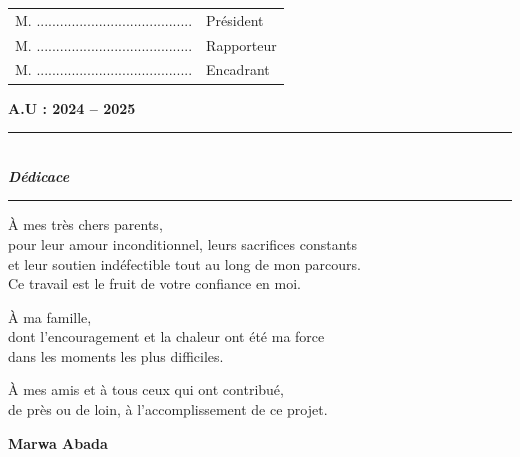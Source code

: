 \begin{titlepage}
\begin{center}
\begin{tabular}{p{7.5cm}p{3.5cm}}
M. ........................................ & Président \\
M. ........................................ & Rapporteur \\
M. ........................................ & Encadrant \\
\end{tabular}

\vfill

{\large \textbf{A.U : 2024 -- 2025}}

\end{center}
\end{titlepage}

\thispagestyle{empty}
\null\vfill
\begin{center}
  {\color{black}\rule{0.6\textwidth}{1pt}}\\[1cm]
  {\Large\itshape\bfseries Dédicace}\\[1cm]
  {\color{black}\rule{0.6\textwidth}{0.4pt}}
\end{center}
\vspace{1cm}

\begin{center}
\begin{minipage}{0.75\textwidth}
\setlength{\parindent}{0pt}
\setlength{\parskip}{0.8em}
\itshape

À mes très chers parents,\\
pour leur amour inconditionnel, leurs sacrifices constants\\
et leur soutien indéfectible tout au long de mon parcours.\\
Ce travail est le fruit de votre confiance en moi.

À ma famille,\\
dont l'encouragement et la chaleur ont été ma force\\
dans les moments les plus difficiles.

À mes amis et à tous ceux qui ont contribué,\\
de près ou de loin, à l'accomplissement de ce projet.

\vspace{1em}
\begin{flushright}
\textbf{Marwa Abada}
\end{flushright}
\end{minipage}
\end{center}


